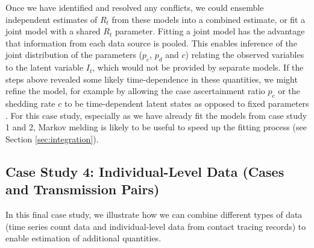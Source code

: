 \documentclass{article}
\begin{document}
\begin{enumerate}
    Once we have identified and resolved any conflicts, we could ensemble independent estimates of $R_t$ from these models into a combined estimate, or fit a joint model with a shared $R_t$ parameter. Fitting a joint model has the advantage that information from each data source is pooled. This enables inference of the joint distribution of the parameters ($p_c$, $p_d$ and $c$) relating the observed variables to the latent variable $I_t$, which would not be provided by separate models.  If the steps above revealed some likely time-dependence in these quantities, we might refine the model, for example by allowing the case ascertainment ratio $p_c$ or the shedding rate $c$ to be time-dependent latent states as opposed to fixed parameters \citep{watson2024jointly}. For this case study, especially as we have already fit the models from case study 1 and 2, Markov melding is likely to be useful to speed up the fitting process (see Section \ref{sec:integration}).
\end{enumerate}

\subsection{Case Study 4: Individual-Level Data (Cases and Transmission Pairs)}

In this final case study, we illustrate how we can combine different types of data (time series count data and individual-level data from contact tracing records) to enable estimation of additional quantities. 
\end{document}
